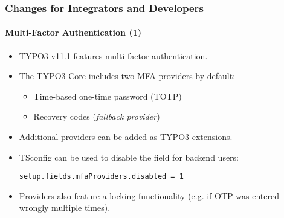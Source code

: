 %

\begin{frame}[fragile]
	\frametitle{Changes for Integrators and Developers}
	\framesubtitle{Multi-Factor Authentication (1)}


	\begin{itemize}
		\item TYPO3 v11.1 features
			\href{https://en.wikipedia.org/wiki/Multi-factor_authentication}{multi-factor authentication}.
		\item The TYPO3 Core includes two MFA providers by default:

			\begin{itemize}
				\item Time-based one-time password (TOTP)
				\item Recovery codes (\textit{fallback provider})
			\end{itemize}

		\item Additional providers can be added as TYPO3 extensions.
		\item TSconfig can be used to disable the field for backend users:
\begin{lstlisting}
setup.fields.mfaProviders.disabled = 1
\end{lstlisting}

		\item Providers also feature a locking functionality
			(e.g. if OTP was entered wrongly multiple times).

	\end{itemize}

\end{frame}

